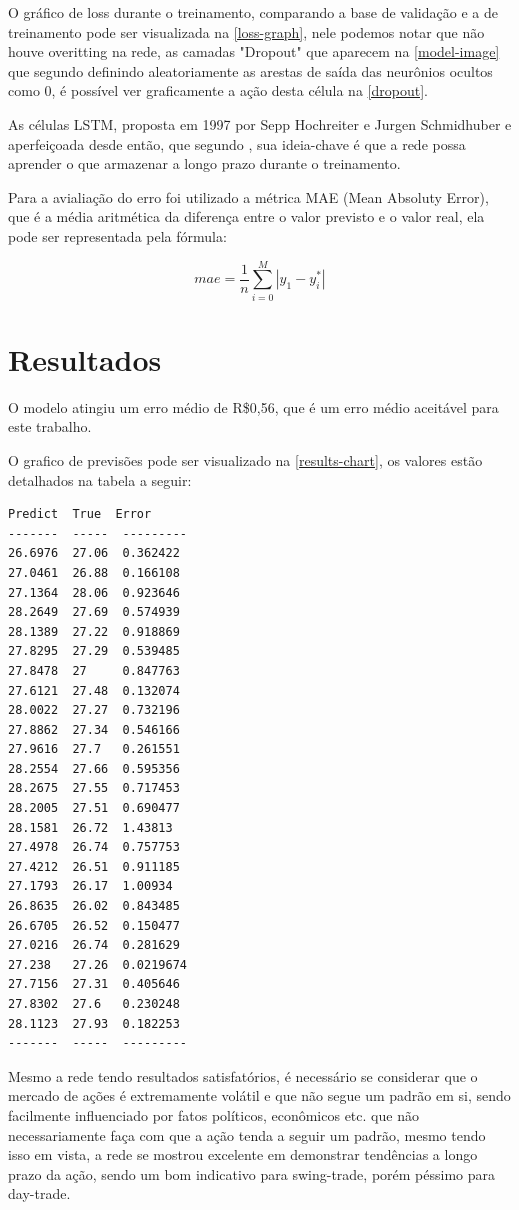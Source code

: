 \documentclass[
	article,			%
	11pt,				%
	oneside,			%
	a4paper,			%
	english,			%
	brazil,				%
	sumario=tradicional
	]{abntex2}
\begin{document}
O gráfico de loss durante o treinamento, comparando a base de validação e a de treinamento pode ser visualizada na \autoref{loss-graph}, nele podemos notar que não houve overitting na rede, as camadas "Dropout" que aparecem na \autoref{model-image} que segundo  definindo aleatoriamente as arestas de saída das neurônios ocultos como 0, é possível ver graficamente a ação desta célula na \autoref{dropout}.

As células LSTM, proposta em 1997 por Sepp Hochreiter e Jurgen Schmidhuber e aperfeiçoada desde então, que segundo , sua ideia-chave é que a rede possa aprender o que armazenar a longo prazo durante o treinamento.

Para a avialiação do erro foi utilizado a métrica MAE (Mean Absoluty Error), que é a média aritmética da diferença entre o valor previsto e o valor real, ela pode ser representada pela fórmula:

\begin{equation}
mae = \frac{1}{n}\sum_{i=0}^M |{y_1 - y^*_i}|
\end{equation}

\section{Resultados}

O modelo atingiu um erro médio de R\$0,56, que é um erro médio aceitável para este trabalho.

O grafico de previsões pode ser visualizado na \autoref{results-chart}, os valores estão detalhados na tabela a seguir:

\begin{verbatim}
Predict  True  Error
-------  -----  ---------
26.6976  27.06  0.362422
27.0461  26.88  0.166108
27.1364  28.06  0.923646
28.2649  27.69  0.574939
28.1389  27.22  0.918869
27.8295  27.29  0.539485
27.8478  27     0.847763
27.6121  27.48  0.132074
28.0022  27.27  0.732196
27.8862  27.34  0.546166
27.9616  27.7   0.261551
28.2554  27.66  0.595356
28.2675  27.55  0.717453
28.2005  27.51  0.690477
28.1581  26.72  1.43813
27.4978  26.74  0.757753
27.4212  26.51  0.911185
27.1793  26.17  1.00934
26.8635  26.02  0.843485
26.6705  26.52  0.150477
27.0216  26.74  0.281629
27.238   27.26  0.0219674
27.7156  27.31  0.405646
27.8302  27.6   0.230248
28.1123  27.93  0.182253
-------  -----  ---------
\end{verbatim}

Mesmo a rede tendo resultados satisfatórios, é necessário se considerar que o mercado de ações é extremamente volátil e que não segue um padrão em si, sendo facilmente influenciado por fatos políticos, econômicos etc. que não necessariamente faça com que a ação tenda a seguir um padrão, mesmo tendo isso em vista, a rede se mostrou excelente em demonstrar tendências a longo prazo da ação, sendo um bom indicativo para swing-trade, porém péssimo para day-trade.
\end{document}
